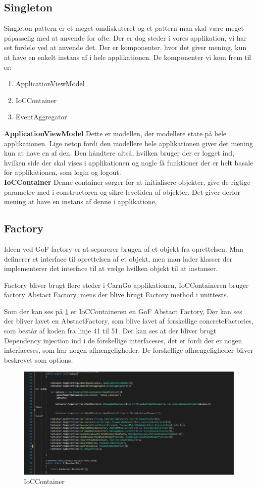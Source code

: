 \documentclass[Implementering/Implementering_main.tex]{subfiles}
\begin{document}
\subsection{Singleton}
Singleton pattern er et meget omdiskuteret og et pattern man skal være meget påpasselig med at anvende for ofte. Der er dog steder i vores applikation, vi har set fordele ved at anvende det. Der er komponenter, hvor det giver mening, kun at have en enkelt instans af i hele applikationen. De komponenter vi kom frem til er:
\begin{enumerate}
    \item ApplicationViewModel
    \item IoCContainer
    \item EventAggregator
\end{enumerate}
\textbf{ApplicationViewModel}
Dette er modellen, der modellere state på hele applikationen. Lige netop fordi den modellere hele applikationen giver det mening kun at have en af den. Den håndtere altså, hvilken bruger der er logget ind, hvilken side der skal vises i applikationen og nogle få funktioner der er helt basale for applikationen, som login og logout.\\

\textbf{IoCContainer}
Denne container sørger for at initialisere objekter, give de rigtige parametre med i constructoren  og sikre levetiden af objekter. Det giver derfor mening at have en instans af denne i applikatione,

\subsection{Factory}
 Ideen ved GoF factory er at separerer brugen af et objekt fra oprettelsen. Man definerer et interface til oprettelsen af et objekt, men man lader klasser der implementerer det interface til at vælge hvilken objekt til at instanser.

Factory bliver brugt flere steder i CarnGo applikationen, IoCContaineren bruger factory Abstact Factory, mens der blive brugt Factory method i unittests.

Som der kan ses på \ref{fig:IoCConatiner} er IoCContaineren en GoF Abstact Factory, Der kan ses der bliver lavet en AbstactFactory, som blive lavet af forskellige concreteFactories, som består af koden fra linje 41 til 51. Der kan ses at der bliver brugt Dependency injection ind i de forskellige interfaceses, det er fordi der er nogen interfaceses, som har nogen afhængeligheder. De forskellige afhængeligheder bliver beskrevet som options.            



\begin{figure}
    \centering
    \includegraphics{Implementering/Graphic/IoCContainer.PNG}
    \caption{IoCContainer}
    \label{fig:IoCConatiner}
\end{figure}
\end{document}
